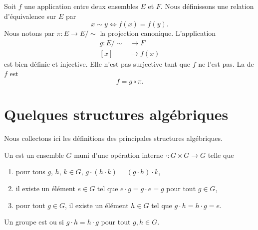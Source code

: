 \begin{example}
Soit \( f\) une application entre deux ensembles \( E\) et \( F\). Nous définissons une relation d'équivalence sur \( E\) par
\begin{equation}
    x\sim y\Leftrightarrow f(x)=f(y).
\end{equation}
Nous notons par \( \pi\colon E\to E/\sim\) la projection canonique. L'application
\begin{equation}
    \begin{aligned}
        g\colon E/\sim&\to F \\
        [x]&\mapsto f(x)
    \end{aligned}
\end{equation}
est bien définie et injective. Elle n'est pas surjective tant que \( f\) ne l'est pas. La  de \( f\) est
\begin{equation}
    f=g\circ\pi.
\end{equation}
\end{example}

\section{Quelques structures algébriques}

Nous collectons ici les définitions des principales structures algébriques.

\begin{definition}[Groupe]      \label{DEFooBMUZooLAfbeM}
    Un  est un ensemble \( G\) muni d'une opération interne \( \cdot\colon G\times G\to G\) telle que
    \begin{enumerate}
        \item
            pour tous \( g\), \( h\), \( k\in G\), \( g\cdot(h\cdot k)=(g\cdot h)\cdot k\),
        \item
            il existe un élément \( e\in G\) tel que \( e\cdot g=g\cdot e=g\) pour tout \( g\in G\),
        \item
            pour tout \( g\in G\), il existe un élément \( h\in  G\) tel que \(g\cdot h=h\cdot g=e \).
    \end{enumerate}
    Un groupe est  ou  si \( g\cdot h=h\cdot g\) pour tout \( g,h\in G\).
\end{definition}

